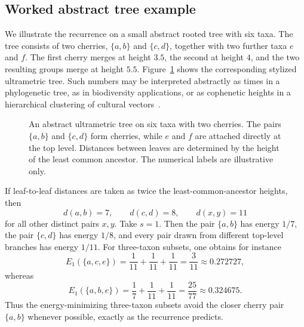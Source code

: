 \documentclass[11pt]{article}
\begin{document}
\subsection{Worked abstract tree example}

We illustrate the recurrence on a small abstract rooted tree with six taxa. The tree consists of two cherries, $\{a,b\}$ and $\{c,d\}$, together with two further taxa $e$ and $f$. The first cherry merges at height $3.5$, the second at height $4$, and the two resulting groups merge at height $5.5$. Figure~\ref{fig:primate-tree-app} shows the corresponding stylized ultrametric tree. Such numbers may be interpreted abstractly as times in a phylogenetic tree, as in biodiversity applications, or as cophenetic heights in a hierarchical clustering of cultural vectors~\cite{HartmannSteel2006,StivalaEtAl2014}.

\begin{figure}[h]
\centering
{}
\caption{An abstract ultrametric tree on six taxa with two cherries. The pairs $\{a,b\}$ and $\{c,d\}$ form cherries, while $e$ and $f$ are attached directly at the top level. Distances between leaves are determined by the height of the least common ancestor. The numerical labels are illustrative only.}
\label{fig:primate-tree-app}
\end{figure}

If leaf-to-leaf distances are taken as twice the least-common-ancestor heights, then
\[
d(a,b)=7,
\qquad
 d(c,d)=8,
\qquad
 d(x,y)=11
\]
for all other distinct pairs $x,y$. Take $s=1$. Then the pair $\{a,b\}$ has energy $1/7$, the pair $\{c,d\}$ has energy $1/8$, and every pair drawn from different top-level branches has energy $1/11$.
For three-taxon subsets, one obtains for instance
\[
E_1(\{a,c,e\})=\frac{1}{11}+\frac{1}{11}+\frac{1}{11}=\frac{3}{11}\approx 0.272727,
\]
whereas
\[
E_1(\{a,b,e\})=\frac{1}{7}+\frac{1}{11}+\frac{1}{11}=\frac{25}{77}\approx 0.324675.
\]
Thus the energy-minimizing three-taxon subsets avoid the closer cherry pair $\{a,b\}$ whenever possible, exactly as the recurrence predicts.
\end{document}

